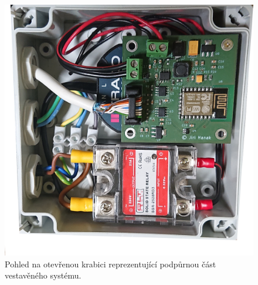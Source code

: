     \begin{figure}[h]
        \centering
        \includegraphics[width=0.6\linewidth]{obrazky-figures/done_02.JPG}
        \caption{Pohled na otevřenou krabici reprezentující podpůrnou část vestavěného systému.}
    \end{figure}
